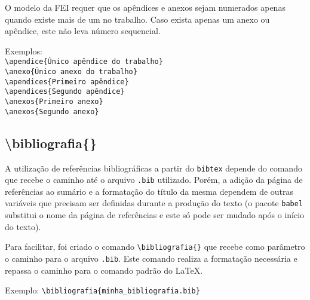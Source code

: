     O modelo da FEI requer que os apêndices e anexos sejam numerados apenas quando existe mais de um no trabalho. Caso exista apenas um anexo ou apêndice, este não leva número sequencial.

    Exemplos: \\
    \verb+\apendice{Único apêndice do trabalho}+ \\
    \verb+\anexo{Único anexo do trabalho}+ \\

    \noindent{}
    \verb+\apendices{Primeiro apêndice}+\\
    \verb+\apendices{Segundo apêndice}+\\

    \noindent{}
    \verb+\anexos{Primeiro anexo}+\\
    \verb+\anexos{Segundo anexo}+\\

    \subsection{\textbackslash bibliografia\{\}}
    A utilização de referências bibliográficas a partir do \texttt{bibtex} depende do comando \verb++ que recebe o caminho até o arquivo \texttt{.bib} utilizado. Porém, a adição da página de referências ao sumário e a formatação do título da mesma dependem de outras variáveis que precisam ser definidas durante a produção do texto (o pacote \verb+babel+ substitui o nome da página de referências e este só pode ser mudado após o início do texto).

    Para facilitar, foi criado o comando \verb+\bibliografia{}+ que recebe como parâmetro o caminho para o arquivo \texttt{.bib}. Este comando realiza a formatação necessária e repassa o caminho para o comando \verb++ padrão do \LaTeX.

    Exemplo: \verb+\bibliografia{minha_bibliografia.bib}+


